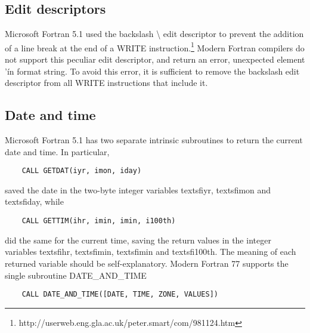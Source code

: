 \subsection{Edit descriptors}

Microsoft Fortran 5.1 used the backslash \textbackslash{} edit descriptor to prevent the addition of a line break at the end of a \textsf{WRITE} instruction.\footnote{http://userweb.eng.gla.ac.uk/peter.smart/com/981124.htm}
Modern Fortran compilers do not support this peculiar edit descriptor, and return an error,  \textsf{unexpected element '\' in format string}. To avoid this error, it is sufficient to remove the backslash edit descriptor from all \textsf{WRITE} instructions that include it.


\subsection{Date and time}

Microsoft Fortran 5.1 has two separate intrinsic subroutines to return the current date and time.
In particular,

\begin{lstlisting}
	CALL GETDAT(iyr, imon, iday)
\end{lstlisting}

saved the date in the two-byte integer variables textsf{iyr}, textsf{imon} and textsf{iday}, while 

\begin{lstlisting}
	CALL GETTIM(ihr, imin, imin, i100th)
\end{lstlisting}

did the same for the current time, saving the return values in the integer variables textsf{ihr}, textsf{imin}, textsf{imin} and textsf{i100th}. The meaning of each returned variable should be self-explanatory.
Modern Fortran 77 supports the single subroutine \textsf{DATE\_AND\_TIME}

\begin{lstlisting}
	CALL DATE_AND_TIME([DATE, TIME, ZONE, VALUES])
\end{lstlisting}

